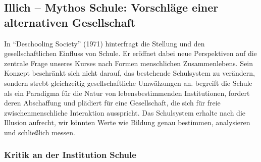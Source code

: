\subsection{Illich -- Mythos Schule: Vorschläge einer alternativen Gesellschaft}

In ``Deschooling Society'' (1971) hinterfragt \citeauthor{Illich-1971} die Stellung und den gesellschaftlichen Einfluss von Schule.
Er eröffnet dabei neue Perspektiven auf die zentrale Frage unseres Kurses nach Formen menschlichen Zusammenlebens.
Sein Konzept beschränkt sich nicht darauf, das bestehende Schulsystem zu verändern, sondern strebt gleichzeitig gesellschaftliche Umwälzungen an.
\citeauthor{Illich-1971} begreift die Schule als ein Paradigma für die Natur von lebensbestimmenden Institutionen, fordert deren Abschaffung und plädiert für eine Gesellschaft, die sich für freie zwischenmenschliche Interaktion ausspricht.
Das Schulsystem erhalte nach \citeauthor{Illich-1971} die Illusion aufrecht, wir könnten Werte wie Bildung genau bestimmen, analysieren und schließlich messen.

\subsubsection{Kritik an der Institution Schule}

